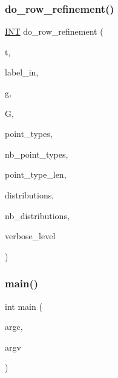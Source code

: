 \subsubsection{\texorpdfstring{do\+\_\+row\+\_\+refinement()}{do\_row\_refinement()}}
{\footnotesize\ttfamily \mbox{\hyperlink{galois_8h_a09fddde158a3a20bd2dcadb609de11dc}{I\+NT}} do\+\_\+row\+\_\+refinement (\begin{DoxyParamCaption}\item[{\mbox{\hyperlink{galois_8h_a09fddde158a3a20bd2dcadb609de11dc}{I\+NT}}}]{t,  }\item[{\mbox{\hyperlink{galois_8h_ab6cc7b4aeb6ea31aba2b3fbfc83ff5e6}{B\+Y\+TE}} $\ast$}]{label\+\_\+in,  }\item[{ofstream \&}]{g,  }\item[{\mbox{\hyperlink{classtdo__scheme}{tdo\+\_\+scheme}} \&}]{G,  }\item[{\mbox{\hyperlink{galois_8h_a09fddde158a3a20bd2dcadb609de11dc}{I\+NT}} $\ast$}]{point\+\_\+types,  }\item[{\mbox{\hyperlink{galois_8h_a09fddde158a3a20bd2dcadb609de11dc}{I\+NT}}}]{nb\+\_\+point\+\_\+types,  }\item[{\mbox{\hyperlink{galois_8h_a09fddde158a3a20bd2dcadb609de11dc}{I\+NT}}}]{point\+\_\+type\+\_\+len,  }\item[{\mbox{\hyperlink{galois_8h_a09fddde158a3a20bd2dcadb609de11dc}{I\+NT}} $\ast$}]{distributions,  }\item[{\mbox{\hyperlink{galois_8h_a09fddde158a3a20bd2dcadb609de11dc}{I\+NT}}}]{nb\+\_\+distributions,  }\item[{\mbox{\hyperlink{galois_8h_a09fddde158a3a20bd2dcadb609de11dc}{I\+NT}}}]{verbose\+\_\+level }\end{DoxyParamCaption})}

\mbox{\label{tdo__refine__all_8_c_a3c04138a5bfe5d72780bb7e82a18e627}} 
\subsubsection{\texorpdfstring{main()}{main()}}
{\footnotesize\ttfamily int main (\begin{DoxyParamCaption}\item[{int}]{argc,  }\item[{char $\ast$$\ast$}]{argv }\end{DoxyParamCaption})}

